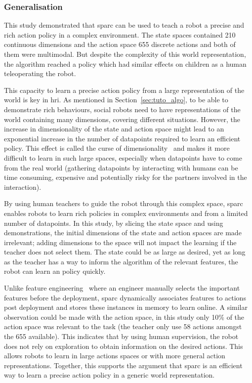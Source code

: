 \subsubsection{Generalisation}


This study demonstrated that \gls{sparc} can be used to teach a robot a precise and rich action policy in a complex environment. The state spaces contained 210 continuous dimensions and the action space 655 discrete actions and both of them were multimodal. But despite the complexity of this world representation, the algorithm reached a policy which had similar effects on children as a human teleoperating the robot. 

This capacity to learn a precise action policy from a large representation of the world is key in \gls{hri}. As mentioned in Section~\ref{sec:tuto_algo}, to be able to demonstrate rich behaviours, social robots need to have representations of the world containing many dimensions, covering different situations. However, the increase in dimensionality of the state and action space might lead to an exponential increase in the number of datapoints required to learn an efficient policy. This effect is called the curse of dimensionality~\citep{bellman1957dynamic} and makes it more difficult to learn in such large spaces, especially when datapoints have to come from the real world (gathering datapoints by interacting with humans can be time consuming, expensive and potentially risky for the partners involved in the interaction).

By using human teachers to guide the robot through this complex space, \gls{sparc} enables robots to learn rich policies in complex environments and from a limited number of datapoints. In this study, by slicing the state space and using demonstrations, the initial dimensions of the state and action spaces are made irrelevant; adding dimensions to the space will not impact the learning if the teacher does not select them. The state could be as large as desired, yet as long as the teacher has a way to inform the algorithm of the relevant features, the robot can learn an policy quickly. 

Unlike feature engineering~\citep{domingos2012few} where an engineer manually selects the important features before the deployment, \gls{sparc} dynamically associates features to actions post deployment and stores these instances in memory to learn online. A similar observation could be made with the action space, in this study only 10\% of the action space was relevant to the task (the teacher only use 58 actions amongst the 655 available). This indicates that by using human supervision, the robot does not rely on exploration to obtain information on the desired actions. This allows robots to learn in large actions spaces or with more general action representations. Together, this supports the argument that \gls{sparc} is an efficient way to learn a precise action policy in a generic world representation.

